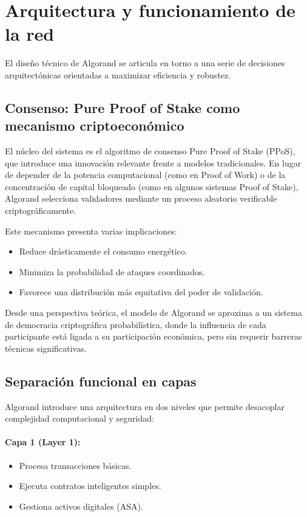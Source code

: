 \documentclass[12pt]{article}
\begin{document}
\section{Arquitectura y funcionamiento de la red}

El diseño técnico de Algorand se articula en torno a una serie de decisiones arquitectónicas orientadas a maximizar eficiencia y robustez.

\subsection{Consenso: Pure Proof of Stake como mecanismo criptoeconómico}

El núcleo del sistema es el algoritmo de consenso Pure Proof of Stake (PPoS), que introduce una innovación relevante frente a modelos tradicionales. En lugar de depender de la potencia computacional (como en Proof of Work) o de la concentración de capital bloqueado (como en algunos sistemas Proof of Stake), Algorand selecciona validadores mediante un proceso aleatorio verificable criptográficamente.

Este mecanismo presenta varias implicaciones:
\begin{itemize}
    \item Reduce drásticamente el consumo energético.
    \item Minimiza la probabilidad de ataques coordinados.
    \item Favorece una distribución más equitativa del poder de validación.
\end{itemize}

Desde una perspectiva teórica, el modelo de Algorand se aproxima a un sistema de democracia criptográfica probabilística, donde la influencia de cada participante está ligada a su participación económica, pero sin requerir barreras técnicas significativas.

\subsection{Separación funcional en capas}

Algorand introduce una arquitectura en dos niveles que permite desacoplar complejidad computacional y seguridad:

\paragraph{Capa 1 (Layer 1):}
\begin{itemize}
    \item Procesa transacciones básicas.
    \item Ejecuta contratos inteligentes simples.
    \item Gestiona activos digitales (ASA).
\end{itemize}
\end{document}
